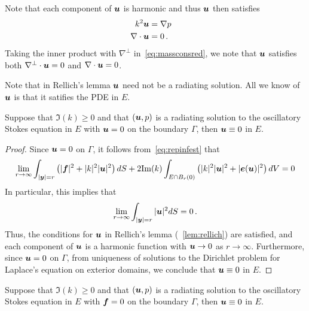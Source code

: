 \begin{remark} \label{rmk:harmu}
Note that each component of ${\boldsymbol u}$ is harmonic and thus ${\boldsymbol u}$ then satisfies
\begin{align}
k^2 {\boldsymbol u} &= \nabla p  \quad \label{eq:massconsred} \\
\nabla \cdot {\boldsymbol u} &= 0 \, .
\end{align}
Taking the inner product with $\nabla^{\perp}$ in~\cref{eq:massconsred}, 
we note that ${\boldsymbol u}$ satisfies both $\nabla^{\perp} \cdot {\boldsymbol u} = 0$ 
and $\nabla \cdot {\boldsymbol u} = 0$.
\end{remark}
\begin{remark}
Note that in Rellich's lemma ${\boldsymbol u}$ need not be a radiating solution. 
All we know of ${\boldsymbol u}$ is that it satifies the PDE in $E$.
\end{remark}

\begin{thrm}
Suppose that $\Im(k)\geq 0$ and 
that $({\boldsymbol u},p)$ is a radiating solution to the oscillatory Stokes
equation in $E$ with ${\boldsymbol u} =0$ on the boundary $\Gamma$, then
${\boldsymbol u} \equiv 0$ in $E$.
\end{thrm}

\begin{proof}
Since ${\boldsymbol u} = 0$ on $\Gamma$, it follows from~\cref{eq:repinfest} that
\begin{equation}
\lim_{r\to\infty}
\int_{|{\boldsymbol y}|=r} \left( |{\boldsymbol f}|^2 + |k|^2 |{\boldsymbol u}|^2 \right) dS +
2 {\textrm{\textup{Im}}}(k) \int_{E \cap B_{r}(0)} \left(|k|^2 |{\boldsymbol u}|^2 + |{\boldsymbol e}({\boldsymbol u})|^2 \right)
dV = 0
\end{equation} 
In particular, this implies that
\begin{equation}
\lim_{r\to\infty} \int_{|{\boldsymbol y}|=r} |{\boldsymbol u}|^2 dS = 0 \, .
\end{equation}
Thus, the conditions for ${\boldsymbol u}$ in Rellich's lemma (~\cref{lem:rellich})
are satisfied, and each component of ${\boldsymbol u}$ is a harmonic function
with ${\boldsymbol u} \to 0$ as $r \to \infty$. Furthermore, since ${\boldsymbol u}=0$ on
$\Gamma$, from uniqueness of solutions to the
Dirichlet problem for Laplace's equation
on exterior domains, we conclude that ${\boldsymbol u} \equiv 0$ in $E$.
\end{proof}

\begin{thrm}
Suppose that $\Im(k)\geq 0$ and 
that $({\boldsymbol u},p)$ is a radiating solution to the oscillatory Stokes
equation in $E$ with ${\boldsymbol f} = 0$ on the boundary $\Gamma$, then
${\boldsymbol u} \equiv 0$ in $E$.
\end{thrm}

